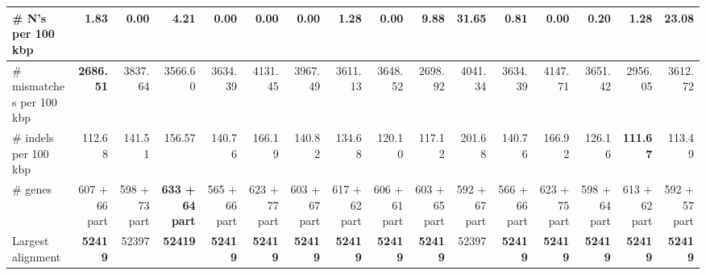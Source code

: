 \documentclass[12pt,a4paper]{article}
\begin{document}
\begin{table}[ht]
\begin{center}
\begin{tabular}{|l*{15}{|r}|}
\# N's per 100 kbp & 1.83 & {\bf 0.00} & 4.21 & {\bf 0.00} & {\bf 0.00} & {\bf 0.00} & 1.28 & {\bf 0.00} & 9.88 & 31.65 & 0.81 & {\bf 0.00} & 0.20 & 1.28 & 23.08 \\ \hline
\# mismatches per 100 kbp & {\bf 2686.51} & 3837.64 & 3566.60 & 3634.39 & 4131.45 & 3967.49 & 3611.13 & 3648.52 & 2698.92 & 4041.34 & 3634.39 & 4147.71 & 3651.42 & 2956.05 & 3612.72 \\ \hline
\# indels per 100 kbp & 112.68 & 141.51 & 156.57 & 140.76 & 166.19 & 140.82 & 134.68 & 120.10 & 117.12 & 201.68 & 140.76 & 166.92 & 126.16 & {\bf 111.67} & 113.49 \\ \hline
\# genes & 607 + 66 part & 598 + 73 part & {\bf 633 + 64 part} & 565 + 66 part & 623 + 77 part & 603 + 67 part & 617 + 62 part & 606 + 61 part & 603 + 65 part & 592 + 67 part & 566 + 66 part & 623 + 75 part & 598 + 64 part & 613 + 62 part & 592 + 57 part \\ \hline
Largest alignment & {\bf 52419} & 52397 & {\bf 52419} & {\bf 52419} & {\bf 52419} & {\bf 52419} & {\bf 52419} & {\bf 52419} & {\bf 52419} & 52397 & {\bf 52419} & {\bf 52419} & {\bf 52419} & {\bf 52419} & {\bf 52419} \\ \hline
\end{tabular}
\end{center}
\end{table}
\end{document}
